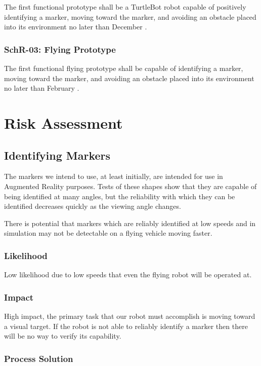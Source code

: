 \documentclass[]{report}
\begin{document}
The first functional prototype shall be a TurtleBot robot capable of positively identifying a marker, moving toward the marker, and avoiding an obstacle placed into its environment no later than December .

\subsection{SchR-03: Flying Prototype}

The first functional flying prototype shall be capable of identifying a marker, moving toward the marker, and avoiding an obstacle placed into its environment no later than February  .

\chapter{Risk Assessment}

\section{Identifying Markers}

The markers we intend to use, at least initially, are intended for use in Augmented Reality purposes. Tests of these shapes show that they are capable of being identified at many angles, but the reliability with which they can be identified decreases quickly as the viewing angle changes. 

There is potential that markers which are reliably identified at low speeds and in simulation may not be detectable on a flying vehicle moving faster.

\subsection{Likelihood}

Low likelihood due to low speeds that even the flying robot will be operated at.

\subsection{Impact}

High impact, the primary task that our robot must accomplish is moving toward a visual target. If the robot is not able to reliably identify a marker then there will be no way to verify its capability.

\subsection{Process Solution}
\end{document}
